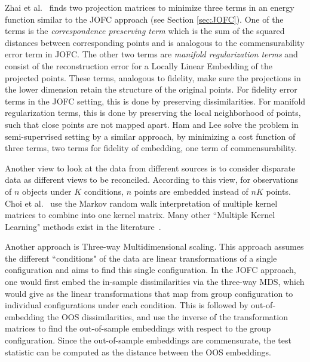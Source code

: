 \documentclass[11pt]{article} %
\begin{document}
 Zhai et al.~\cite{Zhai2010}  finds two projection matrices to minimize three terms in an energy function similar to the  JOFC approach (see Section \ref{sec:JOFC}). One of the terms is the \emph{correspondence preserving term} which is the sum of the squared distances between corresponding points and is analogous to the commensurability error term in JOFC. The other two terms are \emph{manifold regularization terms} and consist of the reconstruction error for a Locally Linear Embedding of the projected points. These terms, analogous to fidelity, make sure the projections in the lower dimension retain the structure of the original points. For fidelity error terms in the JOFC setting, this is done by preserving dissimilarities. For manifold regularization terms, this is done by preserving the local neighborhood of points, such that close points are not mapped apart.
Ham and Lee solve the problem in semi-supervised setting by a similar approach, by minimizing a cost function of three terms, two terms for fidelity of embedding, one term of commensurability.


Another view to look at the data from different sources is to consider disparate data as different views to be reconciled. According to this view, for observations of $n$ objects under $K$ conditions, $n$ points are embedded instead of $nK$ points. Choi et al.\ \cite{Choi:2008:MIM:1619995.1620064} use the Markov random walk interpretation of multiple kernel matrices to combine into one kernel matrix.  Many other ``Multiple Kernel Learning"  methods exist in the literature~\cite{McFee:2011:LMS:1953048.1953063,Lin2009,Lanckriet2004}.

Another approach is Three-way Multidimensional scaling\cite{3wayNMDS,borg+groenen:1997}.
 This approach assumes the  different ``conditions" of the data are linear transformations of a single configuration and aims to find this single configuration. In the JOFC approach, one would first embed the in-sample dissimilarities via the three-way MDS, which would give as the linear transformations that map from group configuration to individual configurations under each condition. This is followed by out-of-embedding the OOS dissimilarities, and use the inverse of the transformation matrices to find the out-of-sample embeddings with respect to the group configuration. Since the out-of-sample embeddings are commensurate, the test statistic can be computed as the distance between the OOS embeddings. 

\end{document}
